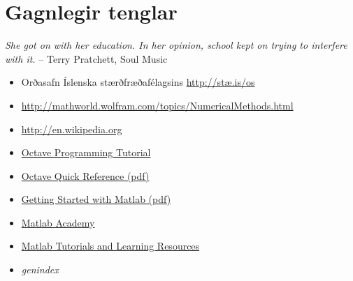 \documentclass[letterpaper,10pt,icelandic]{sphinxmanual}
\begin{document}
\section{Gagnlegir tenglar}
\label{vidauki:gagnlegir-tenglar}
\emph{She got on with her education. In her opinion, school kept on trying to interfere with it.}
-- Terry Pratchett, Soul Music
\begin{itemize}
\item {} 
Orðasafn Íslenska stærðfræðafélagsins \href{http://stae.is/os}{http://stæ.is/os}

\item {} 
\href{http://mathworld.wolfram.com/topics/NumericalMethods.html}{http://mathworld.wolfram.com/topics/NumericalMethods.html}

\item {} 
\href{http://en.wikipedia.org}{http://en.wikipedia.org}

\item {} 
\href{https://en.wikibooks.org/wiki/Octave\_Programming\_Tutorial}{Octave Programming Tutorial}

\item {} 
\href{http://www.lehman.edu/academics/cmacs/documents/refcard-a4.pdf}{Octave Quick Reference (pdf)}

\item {} 
\href{http://se.mathworks.com/help/pdf\_doc/matlab/getstart.pdf?s\_tid=int\_tut}{Getting Started with Matlab (pdf)}

\item {} 
\href{https://matlabacademy.mathworks.com/R2015b/}{Matlab Academy}

\item {} 
\href{http://se.mathworks.com/academia/student\_center/tutorials/launchpad.html}{Matlab Tutorials and Learning Resources}

\end{itemize}
\begin{itemize}
\item {} 
\emph{genindex}

\end{itemize}



\renewcommand{\indexname}{Atriðaskrá}
\printindex
\end{document}
